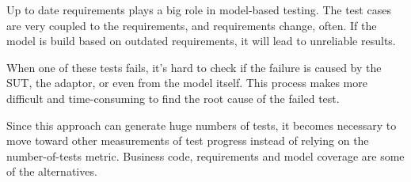 Up to date requirements plays a big role in model-based testing.
The test cases are very coupled to the requirements, and
requirements change, often. If the model is build based on outdated
requirements, it will lead to unreliable results. 

When one of these tests
fails, it's hard to check if the failure is caused by the SUT, the
adaptor, or even from the model itself. This process makes more
difficult and time-consuming to find the root cause of the failed test.

Since this approach can generate huge numbers of tests, it becomes
necessary to move toward other measurements of test progress instead
of relying on the number-of-tests metric. Business code, requirements and model
coverage are some of the alternatives.

